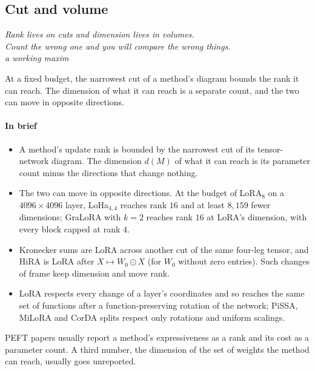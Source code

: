 \subsection{Cut and volume}\label{sec:cut}

\begin{flushright}
\small\itshape Rank lives on cuts and dimension lives in volumes.\\
Count the wrong one and you will compare the wrong things.\\[2pt]
{\upshape\footnotesize a working maxim}
\end{flushright}

At a fixed budget, the narrowest cut of a method's diagram bounds the rank it can reach. The dimension of what it can
reach is a separate count, and the two can move in opposite directions.

\paragraph{In brief}
\begin{itemize}
  \item A method's update rank is bounded by the narrowest cut of its tensor-network diagram. The dimension $d(M)$ of
    what it can reach is its parameter count minus the directions that change nothing.
  \item The two can move in opposite directions. At the budget of LoRA$_8$ on a $4096\times4096$ layer, LoHa$_{4,4}$
    reaches rank $16$ and at least $8{,}159$ fewer dimensions; GraLoRA with $k=2$ reaches rank $16$ at LoRA's
    dimension, with every block capped at rank $4$.
  \item Kronecker sums are LoRA across another cut of the same four-leg tensor, and HiRA is LoRA after
    $X\mapsto W_0\odot X$ (for $W_0$ without zero entries). Such changes of frame keep dimension and move rank.
  \item LoRA respects every change of a layer's coordinates and so reaches the same set of functions after a
    function-preserving rotation of the network; PiSSA, MiLoRA and CorDA splits respect only rotations and uniform
    scalings.
\end{itemize}

PEFT papers usually report a method's expressiveness as a rank and its cost as a parameter count. A third number, the
dimension of the set of weights the method can reach, usually goes unreported.

